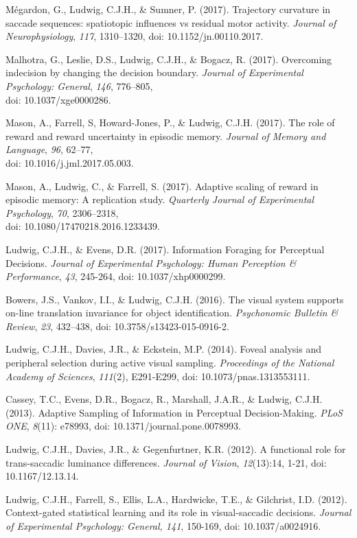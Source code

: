 \documentclass[a4paper, 10pt]{article}
\renewenvironment{itemize}{
  \begin{list}{}{
    \setlength{\leftmargin}{1.5em}
  }
}{
  \end{list}
}
\begin{document}
\begin{itemize}
\item M\'{e}gardon, G., Ludwig, C.J.H., \& Sumner, P. (2017). Trajectory curvature in saccade sequences: spatiotopic influences vs residual motor activity. \textit{Journal of Neurophysiology}, \textit{117}, 1310--1320, doi: 10.1152/jn.00110.2017.
\item Malhotra, G., Leslie, D.S., Ludwig, C.J.H., \& Bogacz, R. (2017). Overcoming indecision by changing the decision boundary. \textit{Journal of Experimental Psychology: General}, \textit{146}, 776--805, \\ doi: 10.1037/xge0000286.
\item Mason, A., Farrell, S, Howard-Jones, P., \& Ludwig, C.J.H. (2017). The role of reward and reward uncertainty in episodic memory. \textit{Journal of Memory and Language}, \textit{96}, 62--77, \\doi: 10.1016/j.jml.2017.05.003.
\item Mason, A., Ludwig, C., \& Farrell, S. (2017). Adaptive scaling of reward in episodic memory: A replication study. \textit{Quarterly Journal of Experimental Psychology}, \textit{70}, 2306--2318, \\doi: 10.1080/17470218.2016.1233439.
\item Ludwig, C.J.H., \& Evens, D.R. (2017). Information Foraging for Perceptual Decisions. \textit{Journal of Experimental Psychology: Human Perception \& Performance}, \textit{43}, 245-264, doi: 10.1037/xhp0000299.
\item Bowers, J.S., Vankov, I.I., \& Ludwig, C.J.H. (2016). The visual system supports on-line translation invariance for object identification. \textit{Psychonomic Bulletin \& Review}, \textit{23}, 432--438, doi: 10.3758/s13423-015-0916-2.
\item Ludwig, C.J.H., Davies, J.R., \& Eckstein, M.P. (2014). Foveal analysis and peripheral selection during active visual sampling. \textit{Proceedings of the National Academy of Sciences}, \textit{111}(2), E291-E299, doi: 10.1073/pnas.1313553111.
\item Cassey, T.C., Evens, D.R., Bogacz, R., Marshall, J.A.R., \& Ludwig, C.J.H. (2013). Adaptive Sampling of Information in Perceptual Decision-Making. \textit{PLoS ONE}, \textit{8}(11): e78993, doi: 10.1371/journal.pone.0078993.
\item Ludwig, C.J.H., Davies, J.R., \& Gegenfurtner, K.R. (2012). A functional role for trans-saccadic luminance differences. \textit{Journal of Vision}, \textit{12}(13):14, 1-21, doi: 10.1167/12.13.14.
\item Ludwig, C.J.H., Farrell, S., Ellis, L.A., Hardwicke, T.E., \& Gilchrist, I.D. (2012). Context-gated statistical learning and its role in visual-saccadic decisions. {\it Journal of Experimental Psychology: General, 141}, 150-169, doi: 10.1037/a0024916.

\end{itemize}
\end{document}

